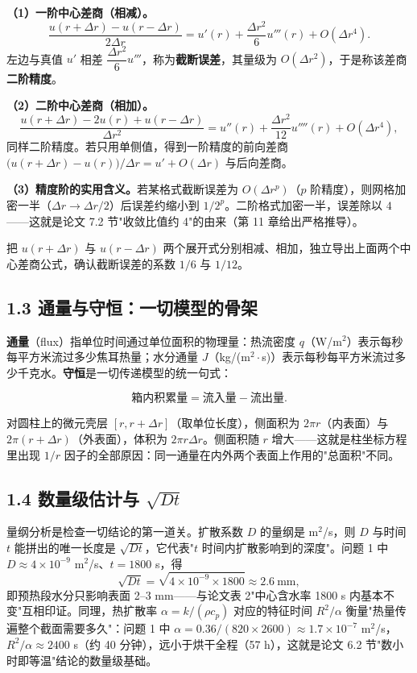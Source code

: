 \documentclass[12pt,a4paper]{ctexart}
\newcommand{\handon}[1]{\par\smallskip\noindent{\heiti 【手推练习】}#1\par\smallskip}
\begin{document}
\textbf{（1）一阶中心差商（相减）。}
\begin{equation}
\frac{u(r+\Delta r)-u(r-\Delta r)}{2\Delta r}=u'(r)+\frac{\Delta r^2}{6}u'''(r)+O(\Delta r^4).
\end{equation}
左边与真值 $u'$ 相差 $\dfrac{\Delta r^2}{6}u'''$，称为\textbf{截断误差}，其量级为 $O(\Delta r^2)$，于是称该差商\textbf{二阶精度}。

\textbf{（2）二阶中心差商（相加）。}
\begin{equation}
\frac{u(r+\Delta r)-2u(r)+u(r-\Delta r)}{\Delta r^2}=u''(r)+\frac{\Delta r^2}{12}u''''(r)+O(\Delta r^4),
\end{equation}
同样二阶精度。若只用单侧值，得到一阶精度的前向差商 $\bigl(u(r+\Delta r)-u(r)\bigr)/\Delta r=u'+O(\Delta r)$ 与后向差商。

\textbf{（3）精度阶的实用含义。}若某格式截断误差为 $O(\Delta r^p)$（$p$ 阶精度），则网格加密一半（$\Delta r\to\Delta r/2$）后误差约缩小到 $1/2^p$。二阶格式加密一半，误差除以 $4$——这就是论文 7.2 节"收敛比值约 4"的由来（第 11 章给出严格推导）。

\handon{把 $u(r+\Delta r)$ 与 $u(r-\Delta r)$ 两个展开式分别相减、相加，独立导出上面两个中心差商公式，确认截断误差的系数 $1/6$ 与 $1/12$。}

\subsection{1.3 通量与守恒：一切模型的骨架}

\textbf{通量}（flux）指单位时间通过单位面积的物理量：热流密度 $q$（W/m$^2$）表示每秒每平方米流过多少焦耳热量；水分通量 $J$（kg/(m$^2\!\cdot$s)）表示每秒每平方米流过多少千克水。\textbf{守恒}是一切传递模型的统一句式：

\begin{equation}
\text{箱内积累量}=\text{流入量}-\text{流出量} .
\end{equation}

对圆柱上的微元壳层 $[r,r+\Delta r]$（取单位长度），侧面积为 $2\pi r$（内表面）与 $2\pi(r+\Delta r)$（外表面），体积为 $2\pi r\Delta r$。侧面积随 $r$ 增大——这就是柱坐标方程里出现 $1/r$ 因子的全部原因：同一通量在内外两个表面上作用的"总面积"不同。

\subsection{1.4 数量级估计与 $\sqrt{Dt}$}

量纲分析是检查一切结论的第一道关。扩散系数 $D$ 的量纲是 m$^2$/s，则 $D$ 与时间 $t$ 能拼出的唯一长度是 $\sqrt{Dt}$，它代表"$t$ 时间内扩散影响到的深度"。问题 1 中 $D\approx4\times10^{-9}$ m$^2$/s、$t=1800$ s，得
\begin{equation}
\sqrt{Dt}=\sqrt{4\times10^{-9}\times1800}\approx2.6\ \mathrm{mm},
\end{equation}
即预热段水分只影响表面 2--3 mm——与论文表 2"中心含水率 1800 s 内基本不变"互相印证。同理，热扩散率 $\alpha=k/(\rho c_p)$ 对应的特征时间 $R^2/\alpha$ 衡量"热量传遍整个截面需要多久"：问题 1 中 $\alpha=0.36/(820\times2600)\approx1.7\times10^{-7}$ m$^2$/s，$R^2/\alpha\approx2400$ s（约 40 分钟），远小于烘干全程（57 h），这就是论文 6.2 节"数小时即等温"结论的数量级基础。
\end{document}
